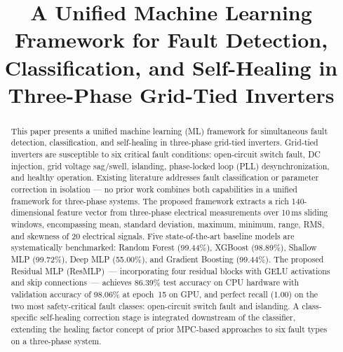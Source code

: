 \documentclass[conference]{IEEEtran}
\begin{document}
\title{A Unified Machine Learning Framework for Fault Detection,
Classification, and Self-Healing in Three-Phase Grid-Tied Inverters}

\author{
}

\maketitle

\begin{abstract}
This paper presents a unified machine learning (ML) framework for simultaneous
fault detection, classification, and self-healing in three-phase grid-tied
inverters. Grid-tied inverters are susceptible to six critical fault conditions:
open-circuit switch fault, DC injection, grid voltage sag/swell, islanding,
phase-locked loop (PLL) desynchronization, and healthy operation. Existing
literature addresses fault classification or parameter correction in
isolation --- no prior work combines both capabilities in a unified framework
for three-phase systems. The proposed framework extracts a rich
140-dimensional feature vector from three-phase electrical measurements over
10\,ms sliding windows, encompassing mean, standard deviation, maximum,
minimum, range, RMS, and skewness of 20 electrical signals. Five
state-of-the-art baseline models are systematically benchmarked: Random
Forest (99.44\%), XGBoost (98.89\%), Shallow MLP (99.72\%), Deep MLP
(55.00\%), and Gradient Boosting (99.44\%). The proposed Residual MLP
(ResMLP)~--- incorporating four residual blocks with GELU activations and
skip connections~--- achieves 86.39\% test accuracy on CPU hardware with
validation accuracy of 98.06\% at epoch~15 on GPU, and perfect recall (1.00)
on the two most safety-critical fault classes: open-circuit switch fault and
islanding. A class-specific self-healing correction stage is integrated
downstream of the classifier, extending the healing factor concept of prior
MPC-based approaches to six fault types on a three-phase system.
\end{abstract}
\end{document}
